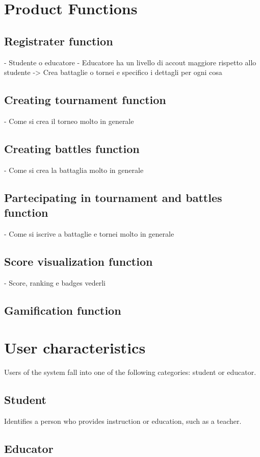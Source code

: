 {\color{orange}
\section{Product Functions}
\subsection{Registrater function}
- Studente o educatore
- Educatore ha un livello di accout maggiore rispetto allo studente -> Crea battaglie o tornei e specifico i dettagli per ogni cosa

\subsection{Creating tournament function}
- Come si crea il torneo molto in generale

\subsection{Creating battles function}
- Come si crea la battaglia molto in generale

\subsection{Partecipating in tournament and battles function}
- Come si iscrive a battaglie e tornei molto in generale

\subsection{Score visualization function}
- Score, ranking e badges vederli

\subsection{Gamification function}

\section{User characteristics}
Users of the system fall into one of the following categories: student or educator.

\subsection*{Student}
Identifies a person who provides instruction or education, such as a teacher.

\subsection*{Educator}
}


